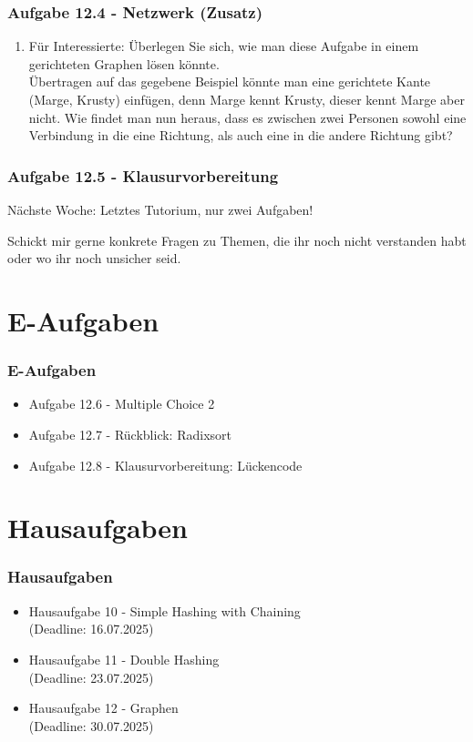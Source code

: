 \documentclass{beamer}
\begin{document}
\begin{frame}[t]
	\frametitle{Aufgabe 12.4 - Netzwerk (Zusatz)}
	\small
	\begin{enumerate}[label=\textcolor{black}{\alph*)},align=left,leftmargin=*,itemsep=0.75em,start=4]
		\item Für Interessierte: Überlegen Sie sich, wie man diese Aufgabe in einem gerichteten
		      Graphen lösen könnte. \\
		      Übertragen auf das gegebene Beispiel könnte man eine gerichtete Kante (Marge, Krusty) einfügen, denn Marge kennt Krusty,
		      dieser kennt Marge aber nicht. Wie findet man nun heraus, dass es zwischen zwei Personen sowohl eine
		      Verbindung in die eine Richtung, als auch eine in die andere Richtung gibt?
	\end{enumerate}
\end{frame}

\begin{frame}
	\frametitle{Aufgabe 12.5 - Klausurvorbereitung}

	Nächste Woche: Letztes Tutorium, nur zwei Aufgaben!

	\bigskip
	Schickt mir gerne konkrete Fragen zu Themen, die ihr noch nicht verstanden habt oder
	wo ihr noch unsicher seid.
\end{frame}

\section{E-Aufgaben}
\begin{frame}
	\frametitle{E-Aufgaben}
	\begin{itemize}
		\item Aufgabe 12.6 - Multiple Choice 2
		\item Aufgabe 12.7 - Rückblick: Radixsort
		\item Aufgabe 12.8 - Klausurvorbereitung: Lückencode
	\end{itemize}
\end{frame}

\section{Hausaufgaben}
\begin{frame}
	\frametitle{Hausaufgaben}
	\begin{itemize}
		\item Hausaufgabe 10 - Simple Hashing with Chaining \\
		      (Deadline: 16.07.2025)
		\item Hausaufgabe 11 - Double Hashing \\
		      (Deadline: 23.07.2025)
		\item Hausaufgabe 12 - Graphen \\
		      (Deadline: 30.07.2025)
	\end{itemize}
\end{frame}
\end{document}
